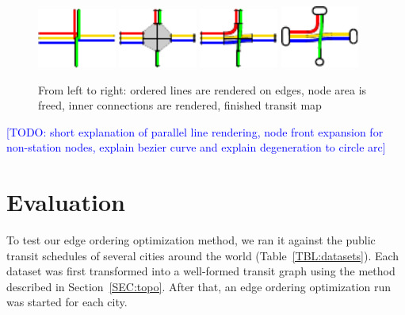 \documentclass{llncs}
\newcommand\todo[1]{\textcolor{blue}{[TODO: #1]}}
\begin{document}
\begin{figure}
  \centering
	\includegraphics[width=0.23\textwidth]{render_examples/rendering/render_example1.pdf}
	\hfill
    \includegraphics[width=0.23\textwidth]{render_examples/rendering/render_example2.pdf}
    \hfill
    \includegraphics[width=0.23\textwidth]{render_examples/rendering/render_example3.pdf}
    \hfill
    \includegraphics[width=0.23\textwidth]{render_examples/rendering/render_example4.pdf}
	\caption{From left to right: ordered lines are rendered on edges, node area is freed, inner connections are rendered, finished transit map}
	\label{FIG:renderingproc}
\end{figure}

\todo{short explanation of parallel line rendering, node front expansion for non-station nodes, explain bezier curve and explain degeneration to circle arc}

%
\section{Evaluation}
%

To test our edge ordering optimization method, we ran it against the public transit schedules of several cities around the world (Table~\ref{TBL:datasets}). Each dataset was first transformed into a well-formed transit graph using the method described in Section~\ref{SEC:topo}. After that, an edge ordering optimization run was started for each city.
\end{document}
